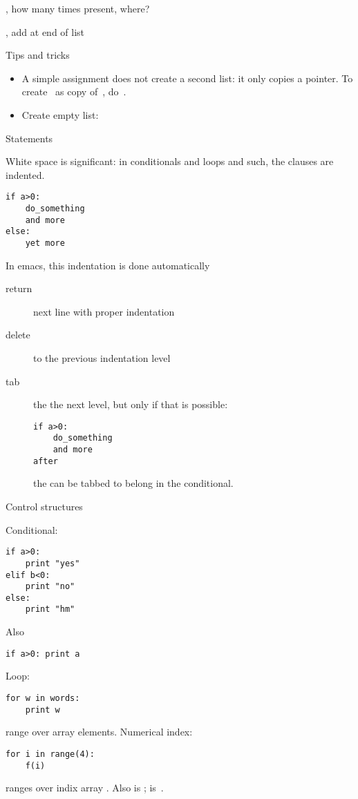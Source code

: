 ,  how many times present, where?

,  add at end of list

 {Tips and tricks}

\begin{itemize}
\item A simple assignment  does not create a second list:
it only copies a pointer. To create~ as copy of~,
do~.
\item Create empty list: 
\end{itemize}

 {Statements}

White space is significant: in conditionals and loops and such, the
clauses are indented.
\begin{verbatim}
if a>0:
    do_something
    and more
else:
    yet more
\end{verbatim}
In emacs, this indentation is done automatically
\begin{description}
\item[return] next line with proper indentation
\item[delete] to the previous indentation level
\item[tab] the the next level, but only if that is possible:
\begin{verbatim}
if a>0:
    do_something
    and more
after
\end{verbatim}
the  can be tabbed to belong in the conditional.
\end{description}

 {Control structures}

Conditional:
\begin{verbatim}
if a>0:
    print "yes"
elif b<0:
    print "no"
else:
    print "hm"
\end{verbatim}
Also
\begin{verbatim}
if a>0: print a
\end{verbatim}

Loop:
\begin{verbatim}
for w in words:
    print w
\end{verbatim}
range over array elements. Numerical index:
\begin{verbatim}
for i in range(4):
    f(i)
\end{verbatim}
ranges over indix array \n{[0,1,2,3]}.
Also  is \n{[1,2,3]};  is~\n{[4,3,2]}.

